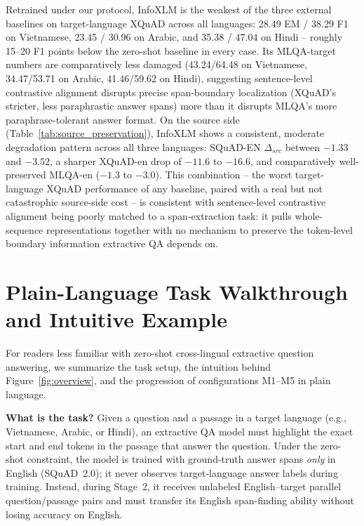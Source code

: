 \documentclass[11pt]{article}
\begin{document}
Retrained under our protocol, InfoXLM is the weakest of the three external baselines on target-language XQuAD across all languages: 28.49 EM / 38.29 F1 on Vietnamese, 23.45 / 30.96 on Arabic, and 35.38 / 47.04 on Hindi -- roughly 15--20 F1 points below the zero-shot baseline in every case. Its MLQA-target numbers are comparatively less damaged (43.24/64.48 on Vietnamese, 34.47/53.71 on Arabic, 41.46/59.62 on Hindi), suggesting sentence-level contrastive alignment disrupts precise span-boundary localization (XQuAD's stricter, less paraphrastic answer spans) more than it disrupts MLQA's more paraphrase-tolerant answer format. On the source side (Table~\ref{tab:source_preservation}), InfoXLM shows a consistent, moderate degradation pattern across all three languages: SQuAD-EN $\Delta_{src}$ between $-1.33$ and $-3.52$, a sharper XQuAD-en drop of $-11.6$ to $-16.6$, and comparatively well-preserved MLQA-en ($-1.3$ to $-3.0$). This combination -- the worst target-language XQuAD performance of any baseline, paired with a real but not catastrophic source-side cost -- is consistent with sentence-level contrastive alignment being poorly matched to a span-extraction task: it pulls whole-sequence representations together with no mechanism to preserve the token-level boundary information extractive QA depends on.

\section{Plain-Language Task Walkthrough and Intuitive Example}
\label{sec:appendix_walkthrough}

For readers less familiar with zero-shot cross-lingual extractive question answering, we summarize the task setup, the intuition behind Figure~\ref{fig:overview}, and the progression of configurations M1--M5 in plain language.

\textbf{What is the task?} Given a question and a passage in a target language (e.g., Vietnamese, Arabic, or Hindi), an extractive QA model must highlight the exact start and end tokens in the passage that answer the question. Under the zero-shot constraint, the model is trained with ground-truth answer spans \emph{only} in English (SQuAD~2.0); it never observes target-language answer labels during training. Instead, during Stage~2, it receives unlabeled English--target parallel question/passage pairs and must transfer its English span-finding ability without losing accuracy on English.
\end{document}
